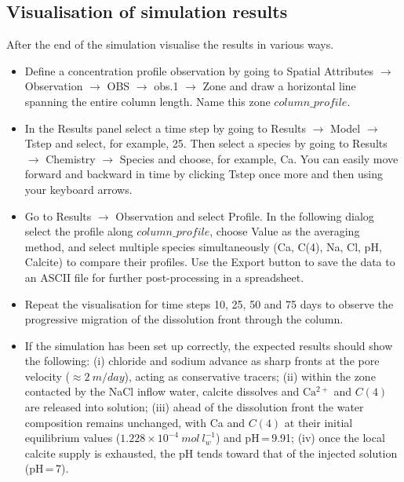 \subsection[Visualisation of simulation results]{Visualisation of simulation results}

After the end of the simulation visualise the results in various ways.

\begin{itemize}

\item Define a concentration profile observation by going to
{\color{blue}Spatial Attributes} $\rightarrow$
{\color{blue}Observation} $\rightarrow$
{\color{blue}OBS} $\rightarrow$
{\color{blue}obs.1} $\rightarrow$
{\color{blue}Zone}
and draw a horizontal line spanning the entire column length.
Name this zone $column\_profile$.

\item In the {\color{blue}Results} panel select a time step by going to
{\color{blue}Results} $\rightarrow$
{\color{blue}Model} $\rightarrow$
{\color{blue}Tstep}
and select, for example, {\color{blue}25}.
Then select a species by going to
{\color{blue}Results} $\rightarrow$
{\color{blue}Chemistry} $\rightarrow$
{\color{blue}Species}
and choose, for example, {\color{blue}Ca}.
You can easily move forward and backward in time by clicking
{\color{blue}Tstep} once more and then using your keyboard arrows.

\item Go to {\color{blue}Results} $\rightarrow$
{\color{blue}Observation}
and select {\color{blue}Profile}.
In the following dialog select the profile along $column\_profile$,
choose {\color{blue}Value} as the averaging method, and select
multiple species simultaneously (Ca, C(4), Na, Cl, pH, Calcite)
to compare their profiles.
Use the {\color{blue}Export} button to save the data to an ASCII file
for further post-processing in a spreadsheet.

\item Repeat the visualisation for time steps 10, 25, 50 and 75 days to
observe the progressive migration of the dissolution front through the
column.

\item If the simulation has been set up correctly, the expected results
should show the following: (i) chloride and sodium advance as sharp
fronts at the pore velocity ($\approx 2\ m/day$), acting as conservative
tracers; (ii) within the zone contacted by the NaCl inflow water,
calcite dissolves and $\mathrm{Ca^{2+}}$ and $C(4)$ are released into
solution; (iii) ahead of the dissolution front the water composition
remains unchanged, with Ca and $C(4)$ at their initial equilibrium
values ($1.228 \times 10^{-4}\ mol\ l^{-1}_w$) and pH\,=\,9.91;
(iv) once the local calcite supply is exhausted, the pH tends toward
that of the injected solution (pH\,=\,7).


\end{itemize}
